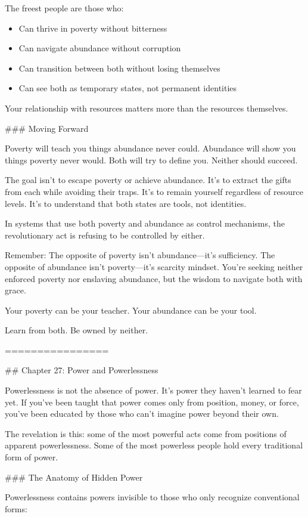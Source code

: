 \documentclass[12pt]{book}
\begin{document}
The freest people are those who:
\begin{itemize}
\item Can thrive in poverty without bitterness
\item Can navigate abundance without corruption
\item Can transition between both without losing themselves
\item Can see both as temporary states, not permanent identities

\end{itemize}
Your relationship with resources matters more than the resources themselves.

\#\#\# Moving Forward

Poverty will teach you things abundance never could. Abundance will show you things poverty never would. Both will try to define you. Neither should succeed.

The goal isn't to escape poverty or achieve abundance. It's to extract the gifts from each while avoiding their traps. It's to remain yourself regardless of resource levels. It's to understand that both states are tools, not identities.

In systems that use both poverty and abundance as control mechanisms, the revolutionary act is refusing to be controlled by either.

Remember: The opposite of poverty isn't abundance—it's sufficiency. The opposite of abundance isn't poverty—it's scarcity mindset. You're seeking neither enforced poverty nor enslaving abundance, but the wisdom to navigate both with grace.

Your poverty can be your teacher. Your abundance can be your tool.

Learn from both. Be owned by neither.

================

\#\# Chapter 27: Power and Powerlessness

Powerlessness is not the absence of power. It's power they haven't learned to fear yet. If you've been taught that power comes only from position, money, or force, you've been educated by those who can't imagine power beyond their own.

The revelation is this: some of the most powerful acts come from positions of apparent powerlessness. Some of the most powerless people hold every traditional form of power.

\#\#\# The Anatomy of Hidden Power

Powerlessness contains powers invisible to those who only recognize conventional forms:
\end{document}

